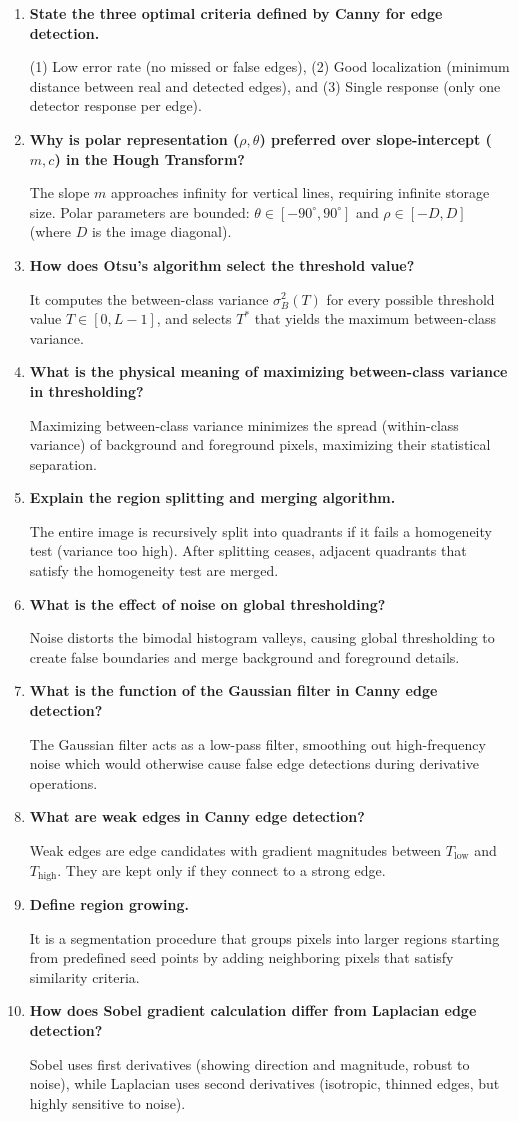 \documentclass[12pt,a4paper]{article}
\newcommand{\Q}[1]{\textbf{#1}\par\noindent\ignorespaces}
\begin{document}
\begin{tcolorbox}[exambox, title={\textbf{Frequently Asked / Viva Questions}}]
\begin{enumerate}[leftmargin=*, itemsep=3.5pt, label=\arabic*.]
  \item \Q{State the three optimal criteria defined by Canny for edge detection.} (1) Low error rate (no missed or false edges), (2) Good localization (minimum distance between real and detected edges), and (3) Single response (only one detector response per edge).
  \item \Q{Why is polar representation ($\rho, \theta$) preferred over slope-intercept ($m,c$) in the Hough Transform?} The slope $m$ approaches infinity for vertical lines, requiring infinite storage size. Polar parameters are bounded: $\theta \in [-90^\circ, 90^\circ]$ and $\rho \in [-D, D]$ (where $D$ is the image diagonal).
  \item \Q{How does Otsu's algorithm select the threshold value?} It computes the between-class variance $\sigma_B^2(T)$ for every possible threshold value $T \in [0, L-1]$, and selects $T^*$ that yields the maximum between-class variance.
  \item \Q{What is the physical meaning of maximizing between-class variance in thresholding?} Maximizing between-class variance minimizes the spread (within-class variance) of background and foreground pixels, maximizing their statistical separation.
  \item \Q{Explain the region splitting and merging algorithm.} The entire image is recursively split into quadrants if it fails a homogeneity test (variance too high). After splitting ceases, adjacent quadrants that satisfy the homogeneity test are merged.
  \item \Q{What is the effect of noise on global thresholding?} Noise distorts the bimodal histogram valleys, causing global thresholding to create false boundaries and merge background and foreground details.
  \item \Q{What is the function of the Gaussian filter in Canny edge detection?} The Gaussian filter acts as a low-pass filter, smoothing out high-frequency noise which would otherwise cause false edge detections during derivative operations.
  \item \Q{What are weak edges in Canny edge detection?} Weak edges are edge candidates with gradient magnitudes between $T_{\text{low}}$ and $T_{\text{high}}$. They are kept only if they connect to a strong edge.
  \item \Q{Define region growing.} It is a segmentation procedure that groups pixels into larger regions starting from predefined seed points by adding neighboring pixels that satisfy similarity criteria.
  \item \Q{How does Sobel gradient calculation differ from Laplacian edge detection?} Sobel uses first derivatives (showing direction and magnitude, robust to noise), while Laplacian uses second derivatives (isotropic, thinned edges, but highly sensitive to noise).
\end{enumerate}
\end{tcolorbox}
\end{document}

